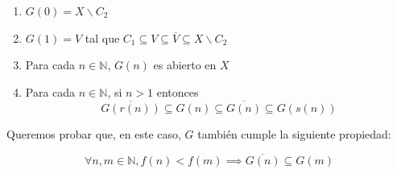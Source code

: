 \documentclass{article}
\newcommand{\nat}{\mathbb{N}}
\begin{document}
\begin{enumerate}
  \item $G(0) = X \backslash C_2$
  \item $G(1) = V$ tal que $C_1 \subseteq V \subseteq \overline{V} \subseteq X \backslash C_2$
  \item Para cada $n \in \nat $, $G(n)$ es abierto en $X$
  \item Para cada $n \in \nat$, si $n>1$ entonces \begin{equation} \label{cond_Grs} \overline{G(r(n))} \subseteq G(n) \subseteq \overline{G(n)} \subseteq G(s(n)) \end{equation}
\end{enumerate}

Queremos probar que, en este caso, $G$ también cumple la siguiente propiedad:

\begin{equation} \label{cond_G}
  \forall n, m \in \nat, f(n) < f(m) \implies \overline{G(n)} \subseteq G(m)
\end{equation}
\end{document}
